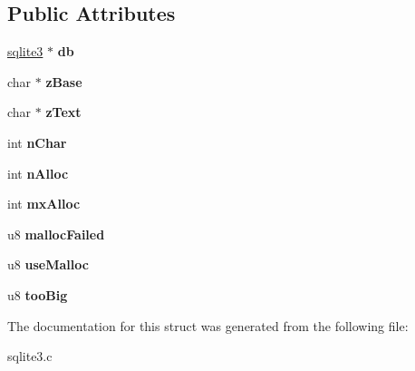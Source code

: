 \subsection*{Public Attributes}
\begin{DoxyCompactItemize}
\item 
\hypertarget{struct_str_accum_ade44091c9a91671c9457b9e4a98a9a5d}{\hyperlink{structsqlite3}{sqlite3} $\ast$ {\bfseries db}}\label{struct_str_accum_ade44091c9a91671c9457b9e4a98a9a5d}

\item 
\hypertarget{struct_str_accum_a5797e2f288573ee98a4025f0f96fe50d}{char $\ast$ {\bfseries z\-Base}}\label{struct_str_accum_a5797e2f288573ee98a4025f0f96fe50d}

\item 
\hypertarget{struct_str_accum_ac45a51cb7b85da2ae9865eac21d416dc}{char $\ast$ {\bfseries z\-Text}}\label{struct_str_accum_ac45a51cb7b85da2ae9865eac21d416dc}

\item 
\hypertarget{struct_str_accum_a88bf779588ca597a41fde3e41186e003}{int {\bfseries n\-Char}}\label{struct_str_accum_a88bf779588ca597a41fde3e41186e003}

\item 
\hypertarget{struct_str_accum_ae2f21c484b737b9903e695977c27815a}{int {\bfseries n\-Alloc}}\label{struct_str_accum_ae2f21c484b737b9903e695977c27815a}

\item 
\hypertarget{struct_str_accum_ab9985e4aabc65bebbf026881ce0b59bd}{int {\bfseries mx\-Alloc}}\label{struct_str_accum_ab9985e4aabc65bebbf026881ce0b59bd}

\item 
\hypertarget{struct_str_accum_a6bc89e5ed8495ddcddadf0940f236c84}{u8 {\bfseries malloc\-Failed}}\label{struct_str_accum_a6bc89e5ed8495ddcddadf0940f236c84}

\item 
\hypertarget{struct_str_accum_abc135ceee2e63f41c101aceca5e9417b}{u8 {\bfseries use\-Malloc}}\label{struct_str_accum_abc135ceee2e63f41c101aceca5e9417b}

\item 
\hypertarget{struct_str_accum_ae5b62e58c33302b44fedf0e204757ced}{u8 {\bfseries too\-Big}}\label{struct_str_accum_ae5b62e58c33302b44fedf0e204757ced}

\end{DoxyCompactItemize}


The documentation for this struct was generated from the following file\-:\begin{DoxyCompactItemize}
\item 
sqlite3.\-c\end{DoxyCompactItemize}
